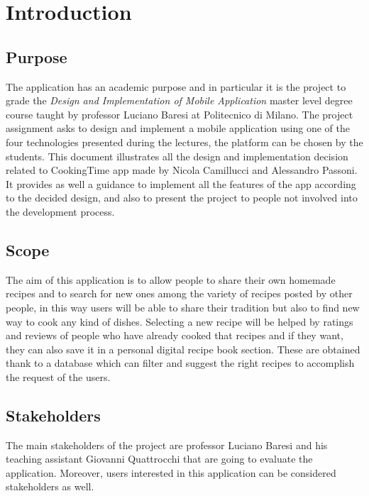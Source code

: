\chapter{Introduction}

	\section{Purpose}
		The application has an academic purpose and in particular it is the project to grade the \textit{Design and Implementation of Mobile Application} master level degree course taught by professor Luciano Baresi at Politecnico di Milano.
		The project assignment asks to design and implement a mobile application using one of the four technologies presented during the lectures, the platform can be chosen by the students. 
		This document illustrates all the design and implementation decision related to CookingTime app made by Nicola Camillucci and Alessandro Passoni. 
		It provides as well a guidance to implement all the features of the app according to the decided design, and also to present the project to people not involved into the development process.


	\section{Scope}
		The aim of this application is to allow people to share their own homemade recipes and to search for new ones among the variety of recipes posted by other people, in this way users will be able to share their tradition but also to find new way to cook any kind of dishes.
		Selecting a new recipe will be helped by ratings and reviews of people who have already cooked that recipes and if they want, they can also save it in a personal digital recipe book section.
		These are obtained thank to a database which can filter and suggest the right recipes to accomplish the request of the users.


	\section{Stakeholders}
		The main stakeholders of the project are professor Luciano Baresi and his teaching assistant Giovanni Quattrocchi that are going to evaluate the application.
		Moreover, users interested in this application can be considered stakeholders as well.



